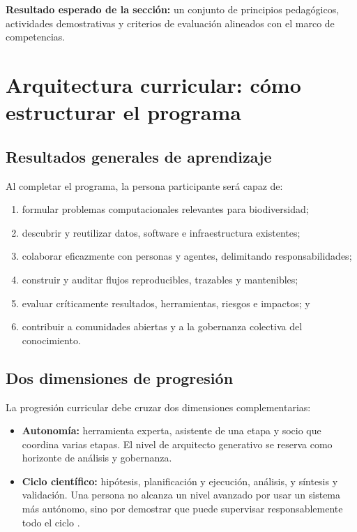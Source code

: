 \documentclass[11pt,a4paper]{article}
\begin{document}
\noindent\textbf{Resultado esperado de la sección:}
un conjunto de principios pedagógicos, actividades demostrativas y criterios de
evaluación alineados con el marco de competencias.

\section{Arquitectura curricular: cómo estructurar el programa}

\subsection{Resultados generales de aprendizaje}

Al completar el programa, la persona participante será capaz de:

\begin{enumerate}
  \item formular problemas computacionales relevantes para biodiversidad;
  \item descubrir y reutilizar datos, software e infraestructura existentes;
  \item colaborar eficazmente con personas y agentes, delimitando
  responsabilidades;
  \item construir y auditar flujos reproducibles, trazables y mantenibles;
  \item evaluar críticamente resultados, herramientas, riesgos e impactos; y
  \item contribuir a comunidades abiertas y a la gobernanza colectiva del
  conocimiento.
\end{enumerate}

\subsection{Dos dimensiones de progresión}

La progresión curricular debe cruzar dos dimensiones complementarias:

\begin{itemize}
  \item \textbf{Autonomía:} herramienta experta, asistente de una etapa y socio
  que coordina varias etapas. El nivel de arquitecto generativo se reserva como
  horizonte de análisis y gobernanza.
  \item \textbf{Ciclo científico:} hipótesis, planificación y ejecución, análisis,
  y síntesis y validación. Una persona no alcanza un nivel avanzado por usar un
  sistema más autónomo, sino por demostrar que puede supervisar responsablemente
  todo el ciclo \citep{wei2025agentic}.
\end{itemize}
\end{document}
